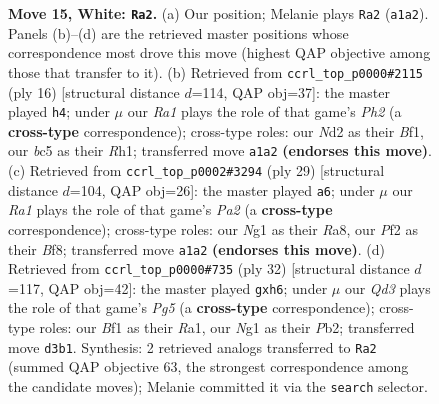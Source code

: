 \documentclass[11pt]{article}
\begin{document}
\begin{figure}[p]
\caption{\textbf{Move 15, White: \texttt{Ra2}.} (a) Our position; Melanie plays \texttt{Ra2} (\texttt{a1a2}). Panels (b)--(d) are the retrieved master positions whose correspondence most drove this move (highest QAP objective among those that transfer to it). (b) Retrieved from \texttt{ccrl\_top\_p0000\#2115} (ply 16) [structural distance $d$=114, QAP obj=37]: the master played \texttt{h4}; under $\mu$ our \emph{Ra1} plays the role of that game's \emph{Ph2} (a \textbf{cross-type} correspondence); cross-type roles: our \emph{N}d2 as their \emph{B}f1, our \emph{b}c5 as their \emph{R}h1; transferred move \texttt{a1a2} \textbf{(endorses this move)}. (c) Retrieved from \texttt{ccrl\_top\_p0002\#3294} (ply 29) [structural distance $d$=104, QAP obj=26]: the master played \texttt{a6}; under $\mu$ our \emph{Ra1} plays the role of that game's \emph{Pa2} (a \textbf{cross-type} correspondence); cross-type roles: our \emph{N}g1 as their \emph{R}a8, our \emph{P}f2 as their \emph{B}f8; transferred move \texttt{a1a2} \textbf{(endorses this move)}. (d) Retrieved from \texttt{ccrl\_top\_p0000\#735} (ply 32) [structural distance $d$=117, QAP obj=42]: the master played \texttt{gxh6}; under $\mu$ our \emph{Qd3} plays the role of that game's \emph{Pg5} (a \textbf{cross-type} correspondence); cross-type roles: our \emph{B}f1 as their \emph{R}a1, our \emph{N}g1 as their \emph{P}b2; transferred move \texttt{d3b1}. Synthesis: 2 retrieved analogs transferred to \texttt{Ra2} (summed QAP objective 63, the strongest correspondence among the candidate moves); Melanie committed it via the \texttt{search} selector.}
\label{fig:thought-m28}
\end{figure}

\clearpage
\end{document}
